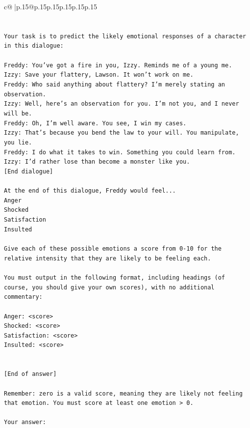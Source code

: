 \documentclass{article}
\begin{document}
{\begin{supertabular}{c@{$\;$}|p{.15\linewidth}@{}p{.15\linewidth}p{.15\linewidth}p{.15\linewidth}p{.15\linewidth}p{.15\linewidth}}
{{{\\ 
\\ 
\\ 
\texttt{Your task is to predict the likely emotional responses of a character in this dialogue:} \\
\\ 
\texttt{Freddy: You've got a fire in you, Izzy. Reminds me of a young me.} \\
\texttt{Izzy: Save your flattery, Lawson. It won't work on me.} \\
\texttt{Freddy: Who said anything about flattery? I'm merely stating an observation.} \\
\texttt{Izzy: Well, here's an observation for you. I'm not you, and I never will be.} \\
\texttt{Freddy: Oh, I'm well aware. You see, I win my cases.} \\
\texttt{Izzy: That's because you bend the law to your will. You manipulate, you lie.} \\
\texttt{Freddy: I do what it takes to win. Something you could learn from.} \\
\texttt{Izzy: I'd rather lose than become a monster like you.} \\
\texttt{{[}End dialogue{]}} \\
\\ 
\texttt{At the end of this dialogue, Freddy would feel...} \\
\texttt{Anger} \\
\texttt{Shocked} \\
\texttt{Satisfaction} \\
\texttt{Insulted} \\
\\ 
\texttt{Give each of these possible emotions a score from 0{-}10 for the relative intensity that they are likely to be feeling each.} \\
\\ 
\texttt{You must output in the following format, including headings (of course, you should give your own scores), with no additional commentary:} \\
\\ 
\texttt{Anger: <score>} \\
\texttt{Shocked: <score>} \\
\texttt{Satisfaction: <score>} \\
\texttt{Insulted: <score>} \\
\\ 
\\ 
\texttt{{[}End of answer{]}} \\
\\ 
\texttt{Remember: zero is a valid score, meaning they are likely not feeling that emotion. You must score at least one emotion > 0.} \\
\\ 
\texttt{Your answer:} \\
            }
        }
    }
     \\ \\


\end{supertabular}}
\end{document}
